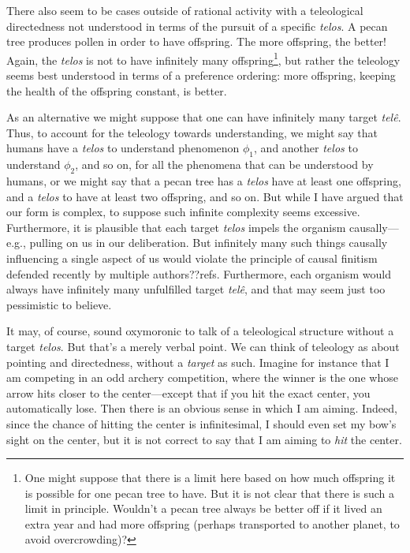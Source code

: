 There also seem to be cases outside of rational activity with a teleological directedness not understood in terms of the pursuit of a specific \textit{telos}. 
A pecan tree produces pollen in order to have offspring. The more offspring, the better! Again, the 
\textit{telos} is not to have infinitely many offspring\footnote{One might suppose that there is a limit here based on how much offspring
it is possible for one pecan tree to have. But it is not clear that there is such a limit in principle. Wouldn't a pecan tree always be better
off if it lived an extra year and had more offspring (perhaps transported to another planet, to avoid overcrowding)?}, but rather the teleology
seems best understood in terms of a preference ordering: more offspring, keeping the health of the offspring constant, is better.

As an alternative we might suppose that one can have infinitely many target \textit{tel\^e}. Thus, to account
for the teleology towards understanding, we might say that humans have a \textit{telos} to understand
phenomenon $\phi_1$, and another \textit{telos} to understand $\phi_2$, and so on, for all the phenomena that can be understood by humans, or we might say that a pecan tree has a \textit{telos} have
at least one offspring, and a \textit{telos} to have at least two offspring, and so on. But while I have argued that our form is 
complex, to suppose such infinite complexity seems excessive. Furthermore, it is plausible that each target \textit{telos} impels the organism
causally---e.g., pulling on us in our deliberation. But infinitely many such things causally influencing a single aspect of us would violate 
the principle of causal finitism defended recently by multiple authors??refs. Furthermore, each organism would always have infinitely 
many unfulfilled target \textit{tel\^e}, and that may seem just too pessimistic to believe.

It may, of course, sound oxymoronic to talk of a teleological structure without a target \textit{telos}. But that's a merely verbal point. We can
think of teleology as about pointing and directedness, without a \textit{target} as such. Imagine for instance that I am competing in an 
odd archery competition, where the winner is the one whose arrow hits closer to the center---except that if you hit the exact center, you
automatically lose. Then there is an obvious sense in which I am aiming. Indeed, since the chance of hitting the center is infinitesimal,
I should even set my bow's sight on the center, but it is not correct to say that I am aiming to \textit{hit} the center. 

